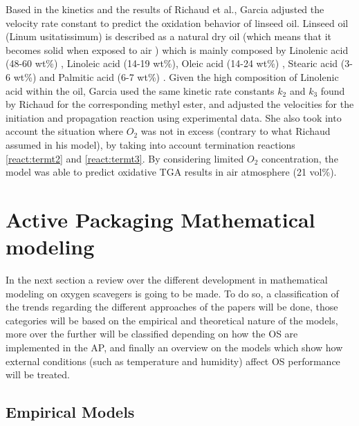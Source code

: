 \begin{refsection}
 Based in the kinetics and the results of Richaud et al., Garcia \cite{GarciaMora2015KineticScavengers} adjusted the velocity rate constant to predict the oxidation behavior of linseed oil. Linseed oil (Linum usitatissimum) is described as a natural dry oil (which means that it becomes solid when exposed to air \cite{Turner-Walker2012TheDegreasing}) which is mainly composed by  Linolenic acid (48-60 wt\%) , Linoleic acid (14-19 wt\%), Oleic acid (14-24 wt\%) , Stearic acid (3-6 wt\%) and Palmitic acid (6-7 wt\%) \cite{lazzari1999drying}. Given the high composition of Linolenic acid  within the oil, Garcia used the same  kinetic rate constants $k_2$ and $k_3$ found by Richaud for the corresponding methyl ester, and adjusted the velocities for the initiation and propagation reaction using experimental data. She also took into account the situation where $O_2$ was not in excess (contrary to what Richaud assumed in his model),  by taking into account termination reactions \ref{react:termt2} and \ref{react:termt3}. By considering limited $O_2$ concentration, the model was able to predict oxidative TGA results in air atmosphere (21 vol\%).
 
\section{Active Packaging Mathematical modeling}\label{sec:modeling}
In the next section a review over the different development in mathematical modeling on oxygen scavegers is going to be made. To do so, a classification of the trends regarding the different approaches of the papers will be done, those categories will be based on the empirical and theoretical nature of the models, more over the further will be classified depending on how the OS are implemented in the AP, and finally an overview on the models which show how external conditions (such as temperature and humidity) affect OS performance will be treated.

\subsection{Empirical Models}


\end{refsection}
